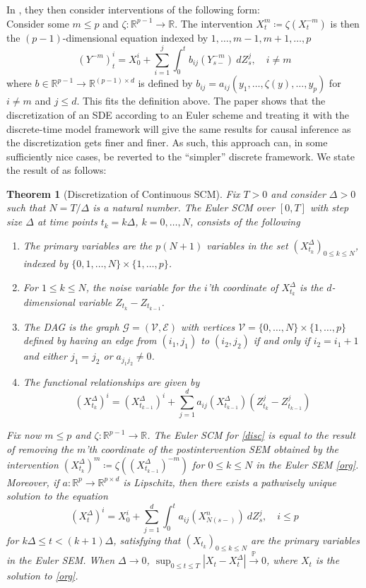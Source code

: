 \documentclass[11pt, a4paper]{memoir}
\theoremstyle{break}
\newtheorem{thm}{Theorem}
\theoremstyle{break}
\theoremstyle{nonumberplain}
\newcommand{\mR}{\mathbb{R}}
\newcommand{\mP}{\mathbb{P}}
\begin{document}
In \cite{sokol2014}, they then consider interventions of the following form:\\[5pt]
Consider some $m\leqslant p$ and $\zeta:\mR^{p-1}\to\mR$. The intervention $X_t^m\coloneqq \zeta(X_t^{-m})$ is then the $(p-1)$-dimensional equation indexed by $1,\ldots,m-1,m+1,\ldots,p$
\begin{equation}\label{disc}
(Y^{-m})_t^i=X_0^i+\sum_{i=1}^j \int_0^t b_{ij}(Y_{s-}^{-m})\ dZ_s^j,\quad i\neq m
\end{equation}
where $b\in \mR^{p-1}\to \mR^{(p-1)\times d}$ is defined by $b_{ij}=a_{ij}(y_1,\ldots,\zeta(y),\ldots,y_p)$ for $i\neq m$ and $j\leqslant d$. This fits the definition above. The paper shows that the discretization of an SDE according to an Euler scheme and treating it with the discrete-time model framework will give the same results for causal inference as the discretization gets finer and finer. As such, this approach can, in some sufficiently nice cases, be reverted to the \enquote{simpler} discrete framework. We state the result of \cite{sokol2014} as follows:
\begin{thm}[Discretization of Continuous SCM]\label{Discret}
Fix $T>0$ and consider $\Delta >0$ such that $N=T/\Delta$ is a natural number. The Euler SCM over $[0,T]$ with step size $\Delta$ at time points $t_k=k\Delta$, $k=0,\ldots, N$, consists of the following
\begin{enumerate}[label=(\roman*)]
	\item The primary variables are the $p(N+1)$ variables in the set $(X^{\Delta}_{t_k})_{0\leqslant k\leqslant N}$, indexed by $\{0,1,\ldots, N\}\times \{1,\ldots ,p\}$.
	\item For $1\leqslant k\leqslant N$, the noise variable for the $i$'th coordinate of $X_{t_k}^{\Delta}$ is the $d$-dimensional variable $Z_{t_k}-Z_{t_{k-1}}$.
	\item The DAG is the graph $\mathcal{G}=(\mathcal{V},\mathcal{E})$ with vertices $\mathcal{V}=\{0,\ldots, N\}\times \{1,\ldots, p\}$ defined by having an edge from $(i_1,j_1)$ to $(i_2,j_2)$ if and only if $i_2=i_1+1$ and either $j_1=j_2$ or $a_{j_1j_2}\neq 0$.
	\item The functional relationships are given by
	$$(X_{t_k}^\Delta)^i=(X_{t_{k-1}}^\Delta)^i+\sum_{j=1}^da_{ij}(X_{t_{k-1}}^{\Delta})(Z_{t_k}^j-Z_{t_{k-1}}^j)$$
\end{enumerate}
Fix now $m\leqslant p$ and $\zeta:\mR^{p-1}\to\mR$. The Euler SCM for \ref{disc} is equal to the result of removing the $m$'th coordinate of the postintervention SEM obtained by the intervention $(X_{t_k}^\Delta)^m\coloneqq \zeta((X_{t_{k-1}}^\Delta)^{-m})$ for $0\leqslant k\leqslant N$ in the Euler SEM \ref{org}.\\[5pt]
Moreover, if $a:\mR^p\to\mR^{p\times d}$ is Lipschitz, then there exists a pathwisely unique solution to the equation 
$$(X^\Delta_t)^i=X_0^i+\sum_{j=1}^d\int_0^t a_{ij}(X^n_{N(s-)})\ dZ_s^j,\quad i\leqslant p$$
for $k\Delta\leqslant t<(k+1)\Delta$, satisfying that $(X_{t_{k}})_{0\leqslant k\leqslant N}$ are the primary variables in the Euler SEM. When $\Delta\to 0$, $\sup_{0\leqslant t\leqslant T}|X_t-X_t^{\Delta}|\overset{\mP}{\to}0$, where $X_t$ is the solution to \ref{org}.
\end{thm}
\end{document}

